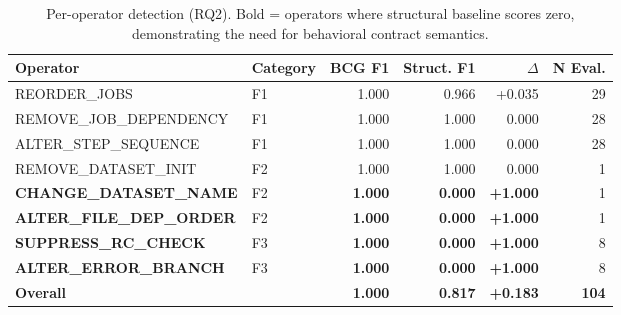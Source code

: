 \begin{table}[t]
\small
\centering
\caption{Per-operator detection (RQ2). Bold = operators where structural baseline scores zero, demonstrating the need for behavioral contract semantics.}
\label{table:per_operator}
\begin{tabular}{llrrrr}
\toprule
Operator & Category & BCG F1 & Struct. F1 & $\Delta$ & N Eval. \\
\midrule
REORDER\_JOBS & F1 & 1.000 & 0.966 & +0.035 & 29 \\
REMOVE\_JOB\_DEPENDENCY & F1 & 1.000 & 1.000 & 0.000 & 28 \\
ALTER\_STEP\_SEQUENCE & F1 & 1.000 & 1.000 & 0.000 & 28 \\
REMOVE\_DATASET\_INIT & F2 & 1.000 & 1.000 & 0.000 & 1 \\
\textbf{CHANGE\_DATASET\_NAME} & F2 & \textbf{1.000} & \textbf{0.000} & \textbf{+1.000} & 1 \\
\textbf{ALTER\_FILE\_DEP\_ORDER} & F2 & \textbf{1.000} & \textbf{0.000} & \textbf{+1.000} & 1 \\
\textbf{SUPPRESS\_RC\_CHECK} & F3 & \textbf{1.000} & \textbf{0.000} & \textbf{+1.000} & 8 \\
\textbf{ALTER\_ERROR\_BRANCH} & F3 & \textbf{1.000} & \textbf{0.000} & \textbf{+1.000} & 8 \\
\midrule
\textbf{Overall} & & \textbf{1.000} & \textbf{0.817} & \textbf{+0.183} & \textbf{104} \\
\bottomrule
\end{tabular}
\end{table}
